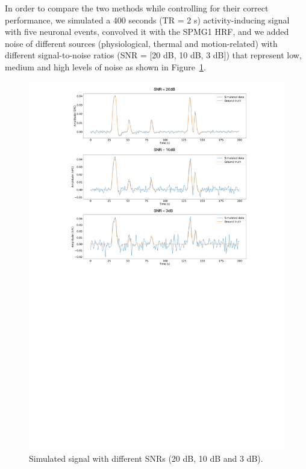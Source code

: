 In order to compare the two methods while controlling for their correct performance, we simulated a 400 seconds (TR = 2 s) activity-inducing signal with five neuronal events, convolved it with the SPMG1 HRF, and we added noise of different sources (physiological, thermal and motion-related) with different signal-to-noise ratios (SNR = [20 dB, 10 dB, 3 dB]) that represent low, medium and high levels of noise as shown in Figure~\ref{fig:simulations}.

\begin{figure}[h]
    \begin{center}
        \includegraphics[width=\columnwidth]{figures/sim.pdf}
    \end{center}
    \caption{Simulated signal with different SNRs (20 dB, 10 dB and 3 dB).}
\label{fig:simulations}
\end{figure}

